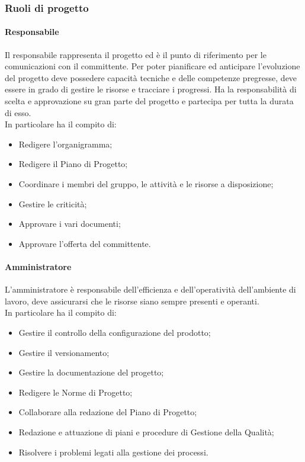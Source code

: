\documentclass[../norme-di-progetto.tex]{subfiles}
\begin{document}
    \subsubsection{Ruoli di progetto}
        \paragraph{Responsabile}
        Il responsabile rappresenta il progetto ed è il punto di riferimento per le comunicazioni con il committente. Per poter pianificare ed anticipare l'evoluzione del progetto deve possedere capacità tecniche e delle competenze pregresse, deve essere in grado di gestire le risorse e tracciare i progressi. Ha la responsabilità di scelta e approvazione su gran parte del progetto e partecipa per tutta la durata di esso.\\
        In particolare ha il compito di:
        \begin{itemize}
            \item Redigere l'organigramma;
            \item Redigere il Piano di Progetto;
            \item Coordinare i membri del gruppo, le attività e le risorse a disposizione;
            \item Gestire le criticità;
            \item Approvare i vari documenti;
            \item Approvare l'offerta del committente.
        \end{itemize}

        \paragraph{Amministratore}
        L'amministratore è responsabile dell'efficienza e dell'operatività dell'ambiente di lavoro, deve assicurarsi che le risorse siano sempre presenti e operanti.\\
        In particolare ha il compito di:
        \begin{itemize}
            \item Gestire il controllo della configurazione del prodotto;
            \item Gestire il versionamento;
            \item Gestire la documentazione del progetto;
            \item Redigere le Norme di Progetto;
            \item Collaborare alla redazione del Piano di Progetto;
            \item Redazione e attuazione di piani e procedure di Gestione della Qualità;
            \item Risolvere i problemi legati alla gestione dei processi.
        \end{itemize}
        
\end{document}
